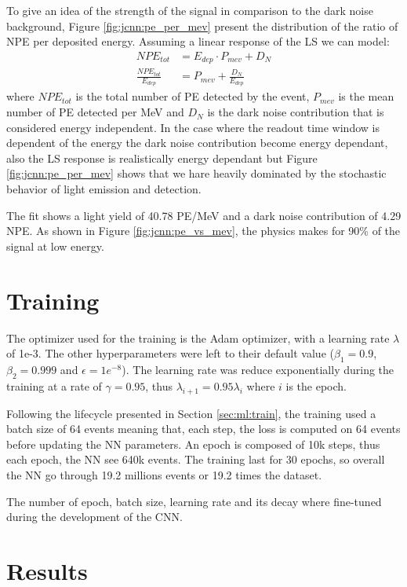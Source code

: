 \documentclass[../main.tex]{subfiles}
\begin{document}
To give an idea of the strength of the signal in comparison to the dark noise background, Figure \ref{fig:jcnn:pe_per_mev} present the distribution of the ratio of NPE per deposited energy. Assuming a linear response of the LS we can model:
\begin{align}
  NPE_{tot} &= E_{dep} \cdot P_{mev} + D_{N} \\
  \frac{NPE_{tot}}{E_{dep}} &= P_{mev} + \frac{D_{N}}{E_{dep}} \label{eq:jcnn:pe_per_mev}
\end{align}
where $NPE_{tot}$ is the total number of PE detected by the event, $P_{mev}$ is the mean number of PE detected per MeV and $D_{N}$ is the dark noise contribution that is considered energy independent. In the case where the readout time window is dependent of the energy the dark noise contribution become energy dependant, also the LS response is realistically energy dependant but Figure \ref{fig:jcnn:pe_per_mev} shows that we hare heavily dominated by the stochastic behavior of light emission and detection.

The fit shows a light yield of 40.78 PE/MeV and a dark noise contribution of 4.29 NPE. As shown in Figure \ref{fig:jcnn:pe_vs_mev}, the physics makes for 90\% of the signal at low energy.

\section{Training}

The optimizer used for the training is the Adam \cite{kingma_adam_2017} optimizer, with a learning rate $\lambda$ of 1e-3. The other hyperparameters were left to their default value ($\beta_1= 0.9$, $\beta_2 = 0.999$ and $\epsilon = 1e^{-8}$). The learning rate was reduce exponentially during the training at a rate of $\gamma = 0.95$, thus $\lambda_{i+1} = 0.95\lambda_i$ where $i$ is the epoch.

Following the lifecycle presented in Section \ref{sec:ml:train}, the training used a batch size of 64 events meaning that, each step, the loss is computed on 64 events before updating the NN parameters. An epoch is composed of 10k steps, thus each epoch, the NN see 640k events. The training last for 30 epochs, so overall the NN go through 19.2 millions events or 19.2 times the dataset.

The number of epoch, batch size, learning rate and its decay where fine-tuned during the development of the CNN.

\section{Results}
\label{sec:jcnn:results}
\end{document}
